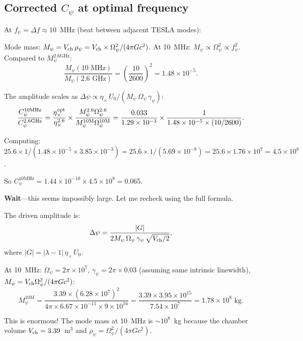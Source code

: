 \documentclass[11pt]{article}
\newcommand{\ee}[1]{\times 10^{#1}}
\newcommand{\Opsi}{\Omega_\psi}
\newcommand{\gpsi}{\gamma_\psi}
\newcommand{\Mpsi}{M_\psi}
\newcommand{\lam}{\lambda}
\begin{document}
\subsection{Corrected $C_\psi$ at optimal frequency}

At $f_\psi = \Delta f \approx 10$~MHz (beat between adjacent
TESLA modes):

Mode mass: $\Mpsi = V_{\rm ch}\,\rho_\psi = V_{\rm ch}
\times \Opsi^2/(4\pi G c^2)$. At 10~MHz:
$\Mpsi \propto \Opsi^2 \propto f_\psi^2$. Compared to
$\Mpsi^{2.6\text{GHz}}$:
\begin{equation}
\frac{\Mpsi(10\text{ MHz})}{\Mpsi(2.6\text{ GHz})}
= \left(\frac{10}{2600}\right)^2 = 1.48\ee{-5}.
\end{equation}

The amplitude scales as $\Delta\psi \propto
\eta_\times\,U_0/(M_\psi\,\Opsi\,\gamma_\psi)$:
\begin{equation}
\frac{C_\psi^{10\text{MHz}}}{C_\psi^{2.6\text{GHz}}}
= \frac{\eta_\times^{\rm opt}}{\eta_\times^{2.6}} \times
\frac{\Mpsi^{2.6}\Opsi^{2.6}}{\Mpsi^{10\text{M}}\Opsi^{10\text{M}}}
= \frac{0.033}{1.29\ee{-3}} \times
\frac{1}{1.48\ee{-5} \times (10/2600)}.
\end{equation}

Computing: $25.6 \times 1/(1.48\ee{-5} \times 3.85\ee{-3})
= 25.6 \times 1/(5.69\ee{-8}) = 25.6 \times 1.76\ee{7} = 4.5\ee{8}$.

So $C_\psi^{10\text{MHz}} = 1.44\ee{-10} \times 4.5\ee{8}
= 0.065$.

\textbf{Wait}---this seems impossibly large. Let me recheck using
the full formula.

The driven amplitude is:
\begin{equation}
\Delta\psi = \frac{|G|}{2\Mpsi\,\Opsi\,\gpsi\,\sqrt{V_{\rm ch}/2}},
\end{equation}
where $|G| = |\lam-1|\,\eta_\times\,U_0$.

At 10~MHz: $\Opsi = 2\pi \times 10^7$, $\gpsi = 2\pi \times 0.03$
(assuming same intrinsic linewidth),
$\Mpsi = V_{\rm ch}\Opsi^2/(4\pi G c^2)$:
\begin{equation}
\Mpsi^{10\text{M}} = \frac{3.39 \times (6.28\ee{7})^2}
{4\pi \times 6.67\ee{-11} \times 9\ee{16}}
= \frac{3.39 \times 3.95\ee{15}}{7.54\ee{7}}
= 1.78\ee{8}\text{ kg}.
\end{equation}

This is enormous! The mode mass at 10~MHz is $\sim 10^8$~kg because
the chamber volume $V_{\rm ch} = 3.39$~m$^3$ and
$\rho_\psi = \Opsi^2/(4\pi G c^2)$.
\end{document}
